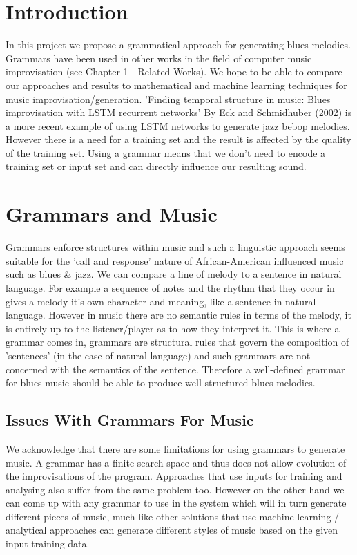 \documentclass[pdftex,12pt,a4paper]{report}
\begin{document}
\section{Introduction}
In this project we propose a grammatical approach for generating blues melodies. Grammars have been used in other works in the field of computer music improvisation (see Chapter 1 - Related Works). We hope to be able to compare our approaches and results to mathematical and machine learning techniques for music improvisation/generation. 'Finding temporal structure in music: Blues improvisation with LSTM recurrent networks' By Eck and Schmidhuber (2002) \cite{eck02} is a more recent example of using LSTM networks to generate jazz bebop melodies. However there is a need for a training set and the result is affected by the quality of the training set. Using a grammar means that we don't need to encode a training set or input set and can directly influence our resulting sound.

\section{Grammars and Music}
Grammars enforce structures within music and such a linguistic approach seems suitable for the 'call and response' nature of African-American influenced music such as blues \& jazz. We can compare a line of melody to a sentence in natural language. For example a sequence of notes and the rhythm that they occur in gives a melody it's own character and meaning, like a sentence in natural language. However in music there are no semantic rules in terms of the melody, it is entirely up to the listener/player as to how they interpret it. This is where a grammar comes in, grammars are structural rules that govern the composition of 'sentences' (in the case of natural language) and such grammars are not concerned with the semantics of the sentence. Therefore a well-defined grammar for blues music should be able to produce well-structured blues melodies.

\subsection{Issues With Grammars For Music} \label{grammarissues}
We acknowledge that there are some limitations for using grammars to generate music. A grammar has a finite search space and thus does not allow evolution of the improvisations of the program. Approaches that use inputs for training and analysing also suffer from the same problem too. However on the other hand we can come up with any grammar to use in the system which will in turn generate different pieces of music, much like other solutions that use machine learning / analytical approaches can generate different styles of music based on the given input training data.
\end{document}
